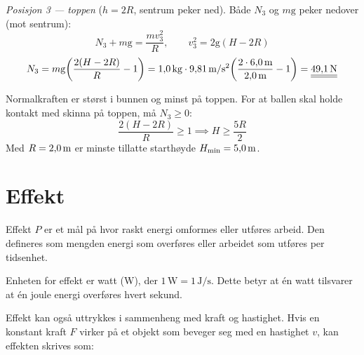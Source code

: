 {\medskip
\noindent\textit{Posisjon 3 — toppen} ($h = 2R$, sentrum peker ned).
Både $N_3$ og $m\mathrm{g}$ peker nedover (mot sentrum):
\[
  N_3 + m\mathrm{g} = \frac{mv_3^2}{R}, \qquad v_3^2 = 2\mathrm{g}(H - 2R)
\]
\[
  N_3 = m\mathrm{g}\!\left(\frac{2(H - 2R)}{R} - 1\right)
      = 1{,}0\,\text{kg}\cdot9{,}81\,\text{m/s\ensuremath{^2}}
        \!\left(\frac{2\cdot6{,}0\,\text{m}}{2{,}0\,\text{m}} - 1\right)
      = \underline{\underline{49{,}1\,\text{N}}}
\]

\begin{tcolorbox}[colback=gray!13, colframe=gray!40, boxrule=0.5pt,
    arc=2pt, left=4pt, right=4pt, top=3pt, bottom=3pt]
  Normalkraften er størst i bunnen og minst på toppen.
  For at ballen skal holde kontakt med skinna på toppen, må $N_3 \geq 0$:
  \[
    \frac{2(H-2R)}{R} \geq 1 \implies H \geq \frac{5R}{2}
  \]
  Med $R = 2{,}0\,\text{m}$ er minste tillatte starthøyde $H_{\min} = 5{,}0\,\text{m}$.
\end{tcolorbox}
}

\section{Effekt}
Effekt \( P \) er et mål på hvor raskt energi omformes eller utføres arbeid. Den defineres som mengden energi som overføres eller arbeidet som utføres per tidsenhet.


Enheten for effekt er watt (W), der \( 1 \, \text{W} = 1 \, \text{J/s} \). Dette betyr at én watt tilsvarer at én joule energi overføres hvert sekund.

Effekt kan også uttrykkes i sammenheng med kraft og hastighet. Hvis en konstant kraft \( F \) virker på et objekt som beveger seg med en hastighet \( v \), kan effekten skrives som:


